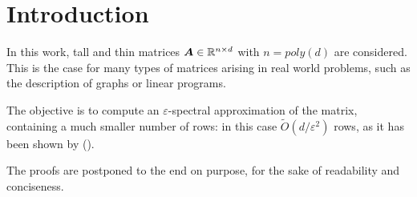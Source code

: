 \section{Introduction}

In this work, tall and thin matrices $\boldsymbol{A} \in \mathbb{R}^{n \times d}$ with
$n = poly(d)$ are considered. This is the case for many types of matrices arising in
real world problems, such as the description of graphs or linear programs.

The objective is to compute an $\varepsilon$-spectral approximation of the
matrix, containing a much smaller number of rows: in this case $\tilde O(d/
\varepsilon^2)$ rows, as it has been shown by \citeauthor{st_sparsification}
(\cite{st_sparsification}).

The proofs are postponed to the end on purpose, for the sake of readability and
conciseness.

